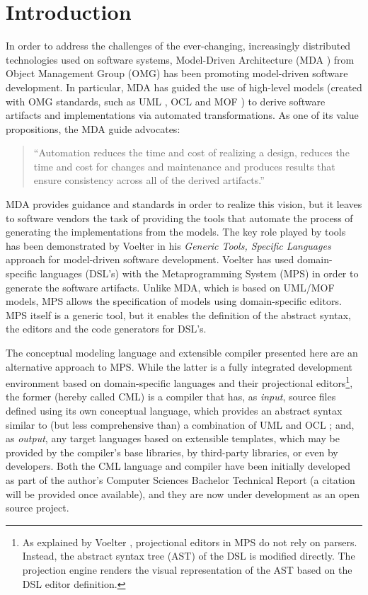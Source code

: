 \section{Introduction}
%
In order to address the challenges of the ever-changing,
increasingly distributed technologies used on software systems,
Model-Driven Architecture (MDA \cite{mda}) from Object Management Group (OMG)
has been promoting model-driven software development.
In particular, MDA has guided the use of high-level models (created with OMG standards,
such as UML \cite{uml}, OCL \cite{ocl} and MOF \cite{mof}) to derive software artifacts and implementations via automated transformations.
As one of its value propositions, the MDA guide \cite{mda} advocates:

\begin{quote}``Automation reduces the time and cost of realizing a design,
reduces the time and cost for changes and maintenance and produces results that ensure consistency across all of the derived artifacts.''\end{quote}

MDA provides guidance and standards in order to realize this vision,
but it leaves to software vendors the task of providing the tools that automate the process of generating the implementations from the models.
The key role played by tools has been demonstrated by Voelter \cite{voelter} in his \emph{Generic Tools, Specific Languages} approach for model-driven software development.
Voelter \cite{voelter} has used domain-specific languages (DSL's) with the Metaprogramming System (MPS) in order to generate the software artifacts.
Unlike MDA, which is based on UML/MOF models,
MPS allows the specification of models using domain-specific editors.
MPS itself is a generic tool,
but it enables the definition of the abstract syntax, the editors and the code generators for DSL's.

The conceptual modeling language and extensible compiler presented here are an alternative approach to MPS.
While the latter is a fully integrated development environment based on domain-specific languages and their projectional editors\footnote{As explained by Voelter \cite{voelter}, projectional editors in MPS do not rely on parsers.
Instead, the abstract syntax tree (AST) of the DSL is modified directly.
The projection engine renders the visual representation of the AST based on the DSL editor definition.},
the former (hereby called CML) is a compiler that has,
as \emph{input}, source files defined using its own conceptual language,
which provides an abstract syntax similar to (but less comprehensive than) a combination of UML \cite{uml} and OCL \cite{ocl};
and, as \emph{output}, any target languages based on extensible templates,
which may be provided by the compiler's base libraries, by third-party libraries, or even by developers. Both the CML language and compiler have been initially developed as part of the author's Computer Sciences Bachelor Technical Report (a citation will be provided once available),
and they are now under development \cite{cml-repo} as an open source project.

